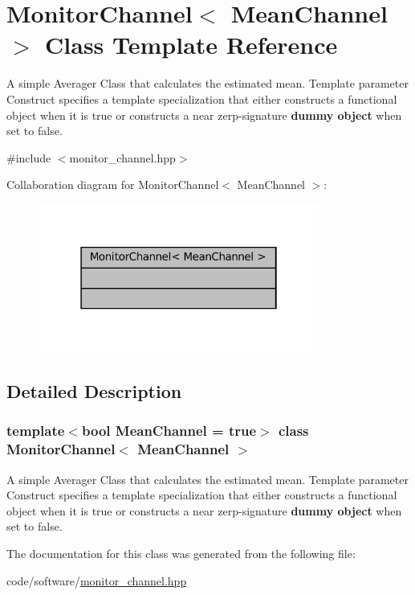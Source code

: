 \hypertarget{classMonitorChannel}{}\section{Monitor\+Channel$<$ Mean\+Channel $>$ Class Template Reference}
\label{classMonitorChannel}


A simple Averager Class that calculates the estimated mean. Template parameter {\ttfamily Construct} specifies a template specialization that either constructs a functional object when it is {\ttfamily true} or constructs a near zerp-\/signature {\bfseries dummy object} when set to {\ttfamily false}.  




{\ttfamily \#include $<$monitor\+\_\+channel.\+hpp$>$}



Collaboration diagram for Monitor\+Channel$<$ Mean\+Channel $>$\+:
\nopagebreak
\begin{figure}[H]
\begin{center}
\leavevmode
\includegraphics[width=262pt]{dc/d18/classMonitorChannel__coll__graph}
\end{center}
\end{figure}


\subsection{Detailed Description}
\subsubsection*{template$<$bool Mean\+Channel = true$>$\newline
class Monitor\+Channel$<$ Mean\+Channel $>$}

A simple Averager Class that calculates the estimated mean. Template parameter {\ttfamily Construct} specifies a template specialization that either constructs a functional object when it is {\ttfamily true} or constructs a near zerp-\/signature {\bfseries dummy object} when set to {\ttfamily false}. 

The documentation for this class was generated from the following file\+:\begin{DoxyCompactItemize}
\item 
code/software/\hyperlink{monitor__channel_8hpp}{monitor\+\_\+channel.\+hpp}\end{DoxyCompactItemize}
